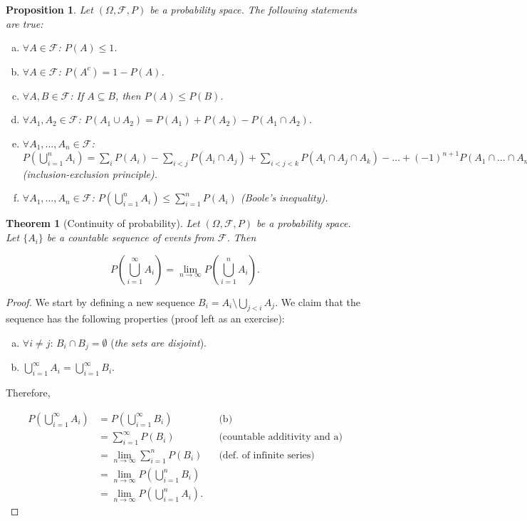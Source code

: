 \documentclass{book}
\theoremstyle{plain}%
\newtheorem{theorem}{Theorem}[section]
\newtheorem{proposition}{Proposition}[section]
\theoremstyle{definition}
\newlength{\arrow}
\begin{document}
\begin{proposition}
Let $(\Omega, \mathcal{F}, P)$ be a probability space. The following statements are true:

\begin{enumerate}[(a)]
\item $\forall A \in \mathcal{F}$: $P(A) \leq 1$.
\item $\forall A \in \mathcal{F}$: $P(A^c) = 1 - P(A)$.
\item $\forall A, B \in \mathcal{F}$: If $A \subseteq B$, then $P(A) \leq P(B)$.
\item $\forall A_1, A_2 \in \mathcal{F}$: $P(A_1 \cup A_2) = P(A_1) + P(A_2) - P(A_1 \cap A_2)$.
\item $\forall A_1,...,A_n\in \mathcal{F}$: $P(\displaystyle\bigcup_{i=1}^n A_i) = \sum_{i} P(A_i) - \sum_{i<j} P(A_i \cap A_j) + \sum_{i<j<k} P(A_i \cap A_j \cap A_k) - \dots + (-1)^{n+1} P(A_1 \cap \dots \cap A_n)$ \textit{(inclusion-exclusion principle)}.
\item $\forall A_1,...,A_n\in \mathcal{F}$: $P(\displaystyle\bigcup_{i=1}^n A_i) \leq \displaystyle\sum_{i=1}^n P(A_i)$ \textit{(Boole's inequality)}.
\end{enumerate}\label{prop:properties_of_probability}
\end{proposition}

\begin{theorem}[Continuity of probability]
Let $(\Omega, \mathcal{F}, P)$ be a probability space. Let $\{A_i\}$ be a countable sequence of events from $\mathcal{F}$. Then

$$P(\bigcup_{i=1}^\infty A_i) = \displaystyle\lim_{n\rightarrow\infty} P(\bigcup_{i=1}^n A_i).$$\label{thm:cont_of_prob}
\end{theorem}

\begin{proof}
We start by defining a new sequence $B_i = A_i \setminus \bigcup_{j < i} A_j$. We claim that the sequence has the following properties (proof left as an exercise):

\begin{enumerate}[(a)]
\item $\forall i \neq j$: $B_i \cap B_j = \emptyset$ (\emph{the sets are disjoint}).
\item $\bigcup_{i=1}^\infty A_i = \bigcup_{i=1}^\infty B_i$.
\end{enumerate}

Therefore,

\begin{align*}
    P(\bigcup_{i=1}^\infty A_i) &= P(\bigcup_{i=1}^\infty B_i) && \text{(b)}\\
    &= \sum_{i=1}^\infty P(B_i)&& \text{(countable additivity and a)}\\
    &=\lim_{n \rightarrow \infty} \sum_{i=1}^n P(B_i) && \text{(def. of infinite series)}\\
    &=\lim_{n \rightarrow \infty} P(\bigcup_{i=1}^n B_i) && \\
    &=\lim_{n \rightarrow \infty} P(\bigcup_{i=1}^n A_i).
\end{align*}\end{proof}
\end{document}
